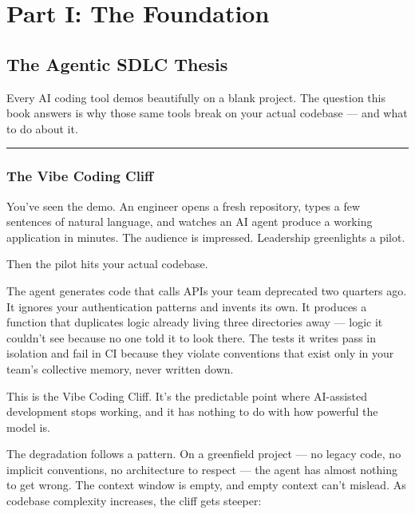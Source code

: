 \documentclass[
  a4paper,
  DIV=11,
  numbers=noendperiod]{scrreprt}
\begin{document}
\part{Part I: The Foundation}

\chapter{The Agentic SDLC Thesis}\label{the-agentic-sdlc-thesis}

Every AI coding tool demos beautifully on a blank project. The question
this book answers is why those same tools break on your actual codebase
--- and what to do about it.

\begin{center}\rule{0.5\linewidth}{0.5pt}\end{center}

\section{The Vibe Coding Cliff}\label{the-vibe-coding-cliff}

You've seen the demo. An engineer opens a fresh repository, types a few
sentences of natural language, and watches an AI agent produce a working
application in minutes. The audience is impressed. Leadership
greenlights a pilot.

Then the pilot hits your actual codebase.

The agent generates code that calls APIs your team deprecated two
quarters ago. It ignores your authentication patterns and invents its
own. It produces a function that duplicates logic already living three
directories away --- logic it couldn't see because no one told it to
look there. The tests it writes pass in isolation and fail in CI because
they violate conventions that exist only in your team's collective
memory, never written down.

This is the Vibe Coding Cliff. It's the predictable point where
AI-assisted development stops working, and it has nothing to do with how
powerful the model is.

The degradation follows a pattern. On a greenfield project --- no legacy
code, no implicit conventions, no architecture to respect --- the agent
has almost nothing to get wrong. The context window is empty, and empty
context can't mislead. As codebase complexity increases, the cliff gets
steeper:
\end{document}
